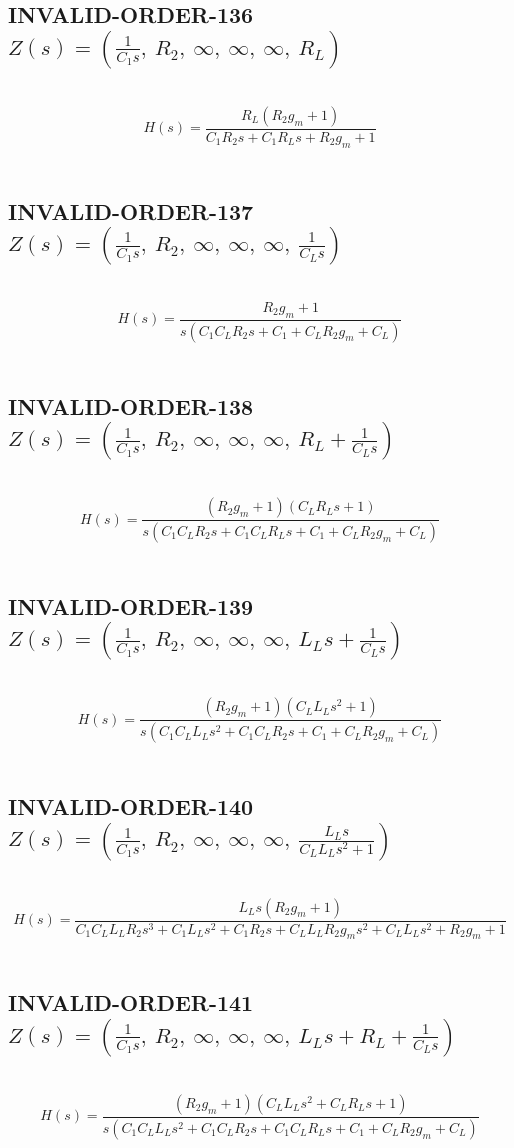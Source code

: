 \documentclass{article}
\begin{document}
\subsection{INVALID-ORDER-136 $Z(s) = \left( \frac{1}{C_{1} s}, \  R_{2}, \  \infty, \  \infty, \  \infty, \  R_{L}\right)$ } \ 
\textbf{\[H(s) = \frac{R_{L} \left(R_{2} g_{m} + 1\right)}{C_{1} R_{2} s + C_{1} R_{L} s + R_{2} g_{m} + 1}\] } \ 
\subsection{INVALID-ORDER-137 $Z(s) = \left( \frac{1}{C_{1} s}, \  R_{2}, \  \infty, \  \infty, \  \infty, \  \frac{1}{C_{L} s}\right)$ } \ 
\textbf{\[H(s) = \frac{R_{2} g_{m} + 1}{s \left(C_{1} C_{L} R_{2} s + C_{1} + C_{L} R_{2} g_{m} + C_{L}\right)}\] } \ 
\subsection{INVALID-ORDER-138 $Z(s) = \left( \frac{1}{C_{1} s}, \  R_{2}, \  \infty, \  \infty, \  \infty, \  R_{L} + \frac{1}{C_{L} s}\right)$ } \ 
\textbf{\[H(s) = \frac{\left(R_{2} g_{m} + 1\right) \left(C_{L} R_{L} s + 1\right)}{s \left(C_{1} C_{L} R_{2} s + C_{1} C_{L} R_{L} s + C_{1} + C_{L} R_{2} g_{m} + C_{L}\right)}\] } \ 
\subsection{INVALID-ORDER-139 $Z(s) = \left( \frac{1}{C_{1} s}, \  R_{2}, \  \infty, \  \infty, \  \infty, \  L_{L} s + \frac{1}{C_{L} s}\right)$ } \ 
\textbf{\[H(s) = \frac{\left(R_{2} g_{m} + 1\right) \left(C_{L} L_{L} s^{2} + 1\right)}{s \left(C_{1} C_{L} L_{L} s^{2} + C_{1} C_{L} R_{2} s + C_{1} + C_{L} R_{2} g_{m} + C_{L}\right)}\] } \ 
\subsection{INVALID-ORDER-140 $Z(s) = \left( \frac{1}{C_{1} s}, \  R_{2}, \  \infty, \  \infty, \  \infty, \  \frac{L_{L} s}{C_{L} L_{L} s^{2} + 1}\right)$ } \ 
\textbf{\[H(s) = \frac{L_{L} s \left(R_{2} g_{m} + 1\right)}{C_{1} C_{L} L_{L} R_{2} s^{3} + C_{1} L_{L} s^{2} + C_{1} R_{2} s + C_{L} L_{L} R_{2} g_{m} s^{2} + C_{L} L_{L} s^{2} + R_{2} g_{m} + 1}\] } \ 
\subsection{INVALID-ORDER-141 $Z(s) = \left( \frac{1}{C_{1} s}, \  R_{2}, \  \infty, \  \infty, \  \infty, \  L_{L} s + R_{L} + \frac{1}{C_{L} s}\right)$ } \ 
\textbf{\[H(s) = \frac{\left(R_{2} g_{m} + 1\right) \left(C_{L} L_{L} s^{2} + C_{L} R_{L} s + 1\right)}{s \left(C_{1} C_{L} L_{L} s^{2} + C_{1} C_{L} R_{2} s + C_{1} C_{L} R_{L} s + C_{1} + C_{L} R_{2} g_{m} + C_{L}\right)}\] } \ 
\end{document}
